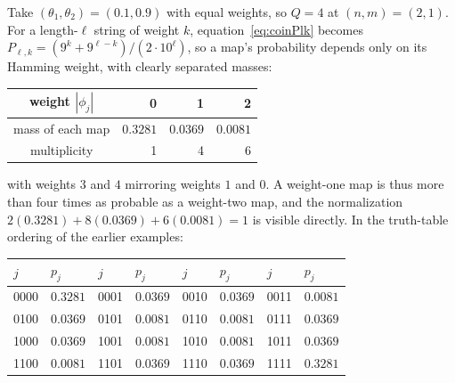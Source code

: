 \begin{example}
Take $(\theta_1,\theta_2) = (0.1, 0.9)$ with equal weights, so
$Q = 4$ at $(n,m) = (2,1)$. For a length-$\ell$ string of weight $k$,
equation~\eqref{eq:coinPlk} becomes
$P_{\ell,k} = (9^k + 9^{\ell-k})/(2\cdot 10^\ell)$, so a map's
probability depends only on its Hamming weight, with clearly
separated masses:

\begin{center}
\begin{tabular}{crrr}
\toprule
weight $|\phi_j|$ & 0 & 1 & 2 \\
\midrule
mass of each map & $0.3281$ & $0.0369$ & $0.0081$ \\
multiplicity & 1 & 4 & 6 \\
\bottomrule
\end{tabular}
\end{center}

with weights $3$ and $4$ mirroring weights $1$ and $0$. A weight-one
map is thus more than four times as probable as a weight-two map, and
the normalization $2(0.3281) + 8(0.0369) + 6(0.0081) = 1$ is visible
directly. In the truth-table ordering of the earlier examples:

\begin{center}
\begin{tabular}{llllllll}
\toprule
$j$ & $p_j$ & $j$ & $p_j$ & $j$ & $p_j$ & $j$ & $p_j$ \\
\midrule
0000 & $0.3281$ & 0001 & $0.0369$ & 0010 & $0.0369$ & 0011 & $0.0081$ \\
0100 & $0.0369$ & 0101 & $0.0081$ & 0110 & $0.0081$ & 0111 & $0.0369$ \\
1000 & $0.0369$ & 1001 & $0.0081$ & 1010 & $0.0081$ & 1011 & $0.0369$ \\
1100 & $0.0081$ & 1101 & $0.0369$ & 1110 & $0.0369$ & 1111 & $0.3281$ \\
\bottomrule
\end{tabular}
\end{center}


\end{example}
